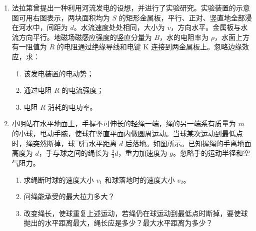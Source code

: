 \documentclass[\gkver]{gaokaozhenti}
\begin{document}
\begin{enumerate}
\item
法拉第曾提出一种利用河流发电的设想，并进行了实验研究。实验装置的示意图可用右图表示，两块面积均为 $S$ 的矩形金属板，平行、正对、竖直地全部浸在河水中，间距为 $d$。水流速度处处相同，大小为 $v$，方向水平。金属板与水流方向平行。地磁场磁感应强度的竖直分量为 $B$，水的电阻率为 $\rho$，水面上方有一阻值为 $R$ 的电阻通过绝缘导线和电键 K 连接到两金属板上。忽略边缘效应，求：
\begin{enumerate}
	\item
	该发电装置的电动势；
	\item
	通过电阻 $R$ 的电流强度；
	\item
	电阻 $R$ 消耗的电功率。
\end{enumerate}



\item
小明站在水平地面上，手握不可伸长的轻绳一端，绳的另一端系有质量为 $m$ 的小球，甩动手腕，使球在竖直平面内做圆周运动。当球某次运动到最低点时，绳突然断掉，球飞行水平距离 $d$ 后落地。如图所示。已知握绳的手离地面高度为 $d$，手与球之间的绳长为 $\frac{3}{4}d$，重力加速度为 $g$。忽略手的运动半径和空气阻力。
\begin{enumerate}
	\item
	求绳断时球的速度大小 $v_{1}$ 和球落地时的速度大小 $v_{2}$。
	\item
	问绳能承受的最大拉力多大？
	\item
	改变绳长，使球重复上述运动，若绳仍在球运动到最低点时断掉，要使球抛出的水平距离最大，绳长应是多少？最大水平距离为多少？
\end{enumerate}


\end{enumerate}
\end{document}
